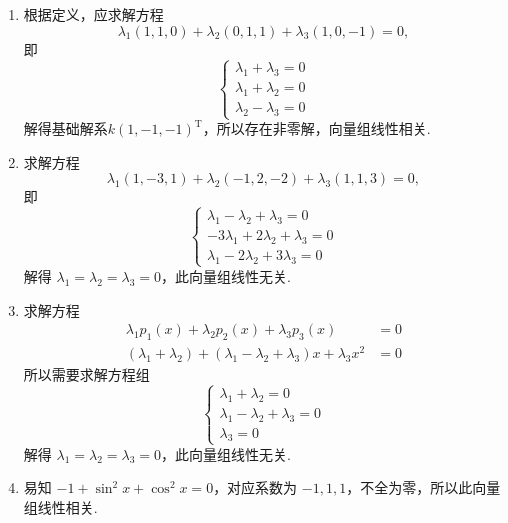 \documentclass[12pt,fontset=fandol]{ctexart}
\begin{document}
\begin{solve}
\begin{enumerate}
        \item 根据定义，应求解方程
              \[\lambda_1(1,1,0) + \lambda_2(0,1,1) + \lambda_3(1,0,-1) = 0,\]
              即
              \[ \begin{cases}
                      \lambda_1 + \lambda_3 = 0 \\
                      \lambda_1 + \lambda_2 = 0 \\
                      \lambda_2 - \lambda_3 = 0
                  \end{cases} \]
              解得基础解系$k(1,-1,-1)^\mathrm{T}$，所以存在非零解，向量组线性相关.

        \item 求解方程
              \[\lambda_1(1,-3,1) + \lambda_2(-1,2,-2) + \lambda_3(1,1,3) = 0,\]
              即
              \[ \begin{cases}
                      \lambda_1 - \lambda_2 + \lambda_3 = 0    \\
                      -3\lambda_1 + 2\lambda_2 + \lambda_3 = 0 \\
                      \lambda_1 - 2\lambda_2 + 3\lambda_3 = 0
                  \end{cases} \]
              解得 $\lambda_1 = \lambda_2 = \lambda_3 = 0$，此向量组线性无关.

        \item 求解方程
              \begin{align*}
                  \lambda_1p_1(x) + \lambda_2p_2(x) + \lambda_3p_3(x)                           & = 0 \\
                  (\lambda_1 + \lambda_2) + (\lambda_1 - \lambda_2 + \lambda_3)x + \lambda_3x^2 & = 0
              \end{align*}
              所以需要求解方程组
              \[ \begin{cases}
                      \lambda_1 + \lambda_2 = 0             \\
                      \lambda_1 - \lambda_2 + \lambda_3 = 0 \\
                      \lambda_3 = 0
                  \end{cases} \]
              解得 $\lambda_1 = \lambda_2 = \lambda_3 = 0$，此向量组线性无关.

        \item 易知 $-1 + \sin^2x + \cos^2x = 0$，对应系数为 $-1, 1, 1$，不全为零，所以此向量组线性相关.


\end{enumerate}
\end{solve}
\end{document}
